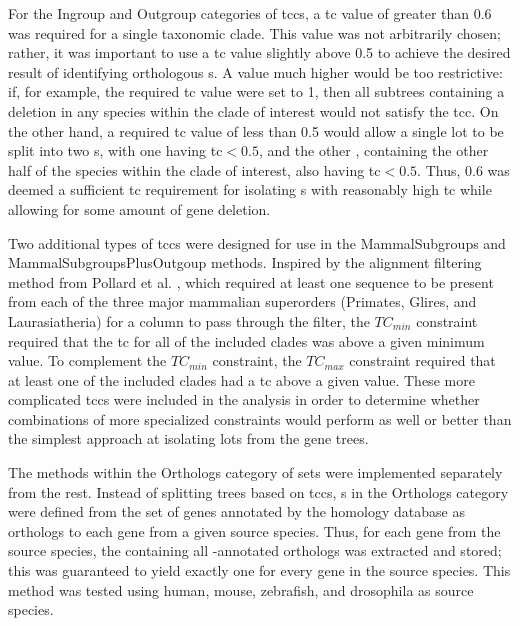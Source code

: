 For the Ingroup and Outgroup categories of \acp{tcc}, a \ac{tc} value
of greater than 0.6 was required for a single taxonomic clade. This
value was not arbitrarily chosen; rather, it was important to use a
\ac{tc} value slightly above 0.5 to achieve the desired result of
identifying orthologous \subtr{}s. A value much higher would be too
restrictive: if, for example, the required \ac{tc} value were set to
1, then all subtrees containing a deletion in any species within the
clade of interest would not satisfy the \ac{tcc}. On the other hand, a
required \ac{tc} value of less than 0.5 would allow a single \ac{lot}
to be split into two \subtr{}s, with one \subtr having \ac{tc}$<0.5$,
and the other \subtr, containing the other half of the species within
the clade of interest, also having \ac{tc}$<0.5$. Thus, 0.6 was deemed
a sufficient \ac{tc} requirement for isolating \subtr{}s with
reasonably high \ac{tc} while allowing for some amount of gene
deletion.

Two additional types of \acp{tcc} were designed for use in the
MammalSubgroups and MammalSubgroupsPlusOutgoup methods. Inspired by
the alignment filtering method from Pollard et
al. \citeyearpar{Pollard2010}, which required at least one sequence to
be present from each of the three major mammalian superorders
(Primates, Glires, and Laurasiatheria) for a column to pass through
the filter, the $TC_{min}$ constraint required that the \ac{tc} for all
of the included clades was above a given minimum value. To complement
the $TC_{min}$ constraint, the $TC_{max}$ constraint required that at
least one of the included clades had a \ac{tc} above a given
value. These more complicated \acp{tcc} were included in the analysis
in order to determine whether combinations of more specialized
constraints would perform as well or better than the simplest approach
at isolating \acp{lot} from the \cmp gene trees.

The methods within the Orthologs category of \subtr{} sets were
implemented separately from the rest. Instead of splitting \cmp trees
based on \acp{tcc}, \subtr{}s in the Orthologs category were defined
from the set of genes annotated by the \ens homology database as
orthologs to each gene from a given source species. Thus, for each
gene from the source species, the \cmp \subtr containing all
\ens{}-annotated orthologs was extracted and stored; this was
guaranteed to yield exactly one \subtr{} for every gene in the source
species. This method was tested using human, mouse, zebrafish, and
drosophila as source species.

